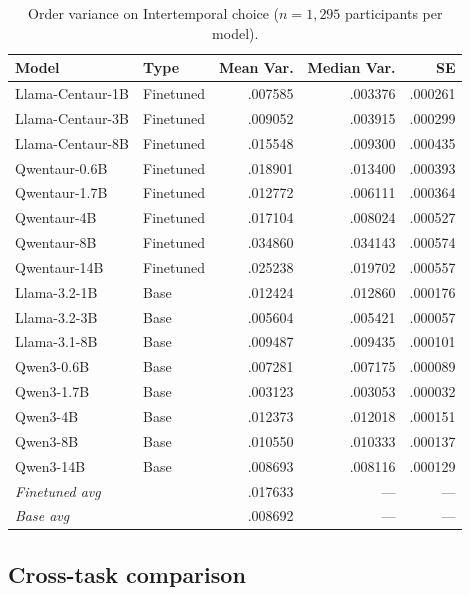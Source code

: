 \documentclass[11pt]{article}
\begin{document}
\begin{table}[ht]
\centering
\caption{Order variance on Intertemporal choice ($n = 1{,}295$ participants per model).}
\label{tab:ruggeri}
\small
\begin{tabular}{llrrr}
\toprule
Model & Type & Mean Var. & Median Var. & SE \\
\midrule
Llama-Centaur-1B  & Finetuned & .007585 & .003376 & .000261 \\
Llama-Centaur-3B  & Finetuned & .009052 & .003915 & .000299 \\
Llama-Centaur-8B  & Finetuned & .015548 & .009300 & .000435 \\
Qwentaur-0.6B     & Finetuned & .018901 & .013400 & .000393 \\
Qwentaur-1.7B     & Finetuned & .012772 & .006111 & .000364 \\
Qwentaur-4B       & Finetuned & .017104 & .008024 & .000527 \\
Qwentaur-8B       & Finetuned & .034860 & .034143 & .000574 \\
Qwentaur-14B      & Finetuned & .025238 & .019702 & .000557 \\
\midrule
Llama-3.2-1B      & Base      & .012424 & .012860 & .000176 \\
Llama-3.2-3B      & Base      & .005604 & .005421 & .000057 \\
Llama-3.1-8B      & Base      & .009487 & .009435 & .000101 \\
Qwen3-0.6B        & Base      & .007281 & .007175 & .000089 \\
Qwen3-1.7B        & Base      & .003123 & .003053 & .000032 \\
Qwen3-4B          & Base      & .012373 & .012018 & .000151 \\
Qwen3-8B          & Base      & .010550 & .010333 & .000137 \\
Qwen3-14B         & Base      & .008693 & .008116 & .000129 \\
\midrule
\multicolumn{2}{l}{\textit{Finetuned avg}} & .017633 & --- & --- \\
\multicolumn{2}{l}{\textit{Base avg}}      & .008692 & --- & --- \\
\bottomrule
\end{tabular}
\end{table}

\subsection{Cross-task comparison}
\end{document}
